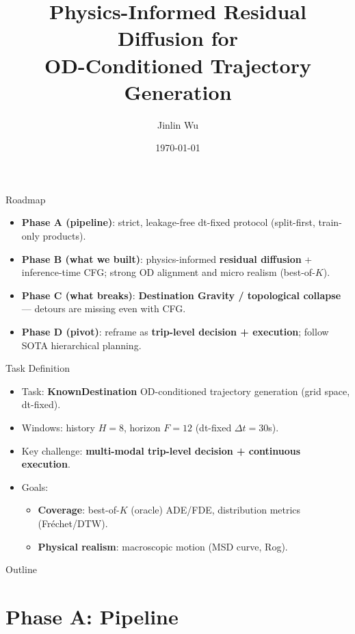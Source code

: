 \documentclass[aspectratio=169]{beamer}
\title{Physics-Informed Residual Diffusion for\\OD-Conditioned Trajectory Generation}
\author{Jinlin Wu}
\date{\today}
\begin{document}
\begin{frame}
  \titlepage
\end{frame}

\begin{frame}{Roadmap}
\begin{itemize}
  \item \textbf{Phase A (pipeline)}: strict, leakage-free dt-fixed protocol (split-first, train-only products).
  \item \textbf{Phase B (what we built)}: physics-informed \textbf{residual diffusion} + inference-time CFG; strong OD alignment and micro realism (best-of-$K$).
  \item \textbf{Phase C (what breaks)}: \textbf{Destination Gravity / topological collapse} --- detours are missing even with CFG.
  \item \textbf{Phase D (pivot)}: reframe as \textbf{trip-level decision + execution}; follow SOTA hierarchical planning.
\end{itemize}
\end{frame}

\begin{frame}{Task Definition}
\begin{itemize}
  \item Task: \textbf{KnownDestination} OD-conditioned trajectory generation (grid space, dt-fixed).
  \item Windows: history $H{=}8$, horizon $F{=}12$ (dt-fixed $\Delta t=30$s).
  \item Key challenge: \textbf{multi-modal trip-level decision + continuous execution}.
  \item Goals:
    \begin{itemize}
      \item \textbf{Coverage}: best-of-$K$ (oracle) ADE/FDE, distribution metrics (Fr\'echet/DTW).
      \item \textbf{Physical realism}: macroscopic motion (MSD curve, Rog).
    \end{itemize}
\end{itemize}
\end{frame}

\begin{frame}{Outline}
  \tableofcontents
\end{frame}

\section{Phase A: Pipeline}
\end{document}
